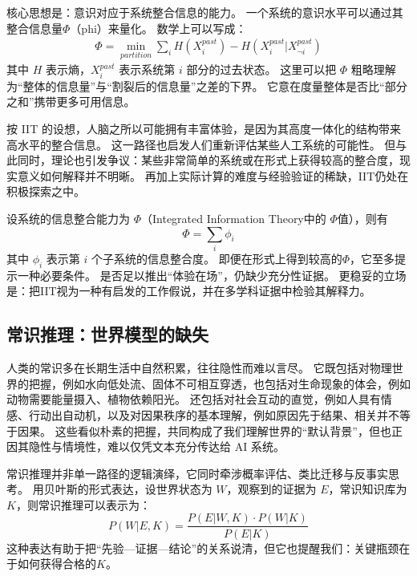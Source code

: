 核心思想是：意识对应于系统整合信息的能力。
一个系统的意识水平可以通过其整合信息量$\Phi$（phi）来量化。
数学上可以写成：
\begin{align}
\Phi = \min_{partition} \sum_{i} H(X_i^{past}) - H(X_i^{past}|X_{\neg i}^{past})
\end{align}
其中 $H$ 表示熵，$X_i^{past}$ 表示系统第 $i$ 部分的过去状态。
这里可以把 $\Phi$ 粗略理解为“整体的信息量”与“割裂后的信息量”之差的下界。
它意在度量整体是否比“部分之和”携带更多可用信息。

按 IIT 的设想，人脑之所以可能拥有丰富体验，是因为其高度一体化的结构带来高水平的整合信息。
这一路径也启发人们重新评估某些人工系统的可能性。
但与此同时，理论也引发争议：某些非常简单的系统或在形式上获得较高的整合度，现实意义如何解释并不明晰。
再加上实际计算的难度与经验验证的稀缺，IIT仍处在积极探索之中。

设系统的信息整合能力为 $\Phi$（Integrated Information Theory中的 $\Phi$值），则有
\begin{equation}
\Phi = \sum_{i} \phi_i
\end{equation}
其中 $\phi_i$ 表示第 $i$ 个子系统的信息整合度。
即便在形式上得到较高的$\Phi$，它至多提示一种必要条件。
是否足以推出“体验在场”，仍缺少充分性证据。
更稳妥的立场是：把IIT视为一种有启发的工作假说，并在多学科证据中检验其解释力。

\subsection{常识推理：世界模型的缺失}

人类的常识多在长期生活中自然积累，往往隐性而难以言尽。
它既包括对物理世界的把握，例如水向低处流、固体不可相互穿透，也包括对生命现象的体会，例如动物需要能量摄入、植物依赖阳光。
还包括对社会互动的直觉，例如人具有情感、行动出自动机，以及对因果秩序的基本理解，例如原因先于结果、相关并不等于因果。
这些看似朴素的把握，共同构成了我们理解世界的“默认背景”，但也正因其隐性与情境性，难以仅凭文本充分传达给 AI 系统。

常识推理并非单一路径的逻辑演绎，它同时牵涉概率评估、类比迁移与反事实思考。
用贝叶斯的形式表达，设世界状态为 $W$，观察到的证据为 $E$，常识知识库为 $K$，则常识推理可以表示为：
\begin{equation}
P(W|E, K) = \frac{P(E|W, K) \cdot P(W|K)}{P(E|K)}
\end{equation}
这种表达有助于把“先验—证据—结论”的关系说清，但它也提醒我们：关键瓶颈在于如何获得合格的$K$。

